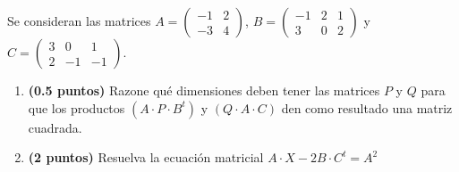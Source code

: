
Se consideran las matrices
$A=\begin{pmatrix}-1&2\\-3&4\end{pmatrix}$,
$B=\begin{pmatrix}-1&2&1\\3&0&2\end{pmatrix}$ y
$C=\begin{pmatrix}3&0&1\\2&-1&-1\end{pmatrix}$.
\begin{enumerate}[label=\alph*)]
\item \textbf{(0.5 puntos)} Razone qué dimensiones deben tener las matrices $P$ y $Q$ para que los productos $(A\cdot P\cdot B^t)$ y $(Q\cdot A\cdot C)$ den como resultado una matriz cuadrada.
\item \textbf{(2 puntos)} Resuelva la ecuación matricial $A\cdot X-2B\cdot C^t=A^2$
\end{enumerate}

